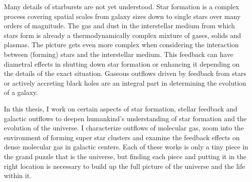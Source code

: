 Many details of starbursts are not yet understood. Star formation is a complex process covering spatial scales from galaxy sizes down to single stars over many orders of magnitude. The gas and dust in the interstellar medium from which stars form is already a thermodynamically complex mixture of gases, solids and plasmas. The picture gets even more complex when considering the interaction between (forming) stars and the interstellar medium. This feedback can have diametral effects in shutting down star formation or enhancing it depending on the details of the exact situation. Gaseous outflows driven by feedback from stars or actively accreting black holes are an integral part in determining the evolution of a galaxy.

In this thesis, I work on certain aspects of star formation, stellar feedback and galactic outflows to deepen humankind's understanding of star formation and the evolution of the universe.
I characterize outflows of molecular gas, zoom into the environment of forming super star clusters and examine the feedback effects on dense molecular gas in galactic centers.
Each of these works is only a tiny piece in the grand puzzle that is the universe, but finding each piece and putting it in the right location is necessary to build up the full picture of the universe and the life within it.


